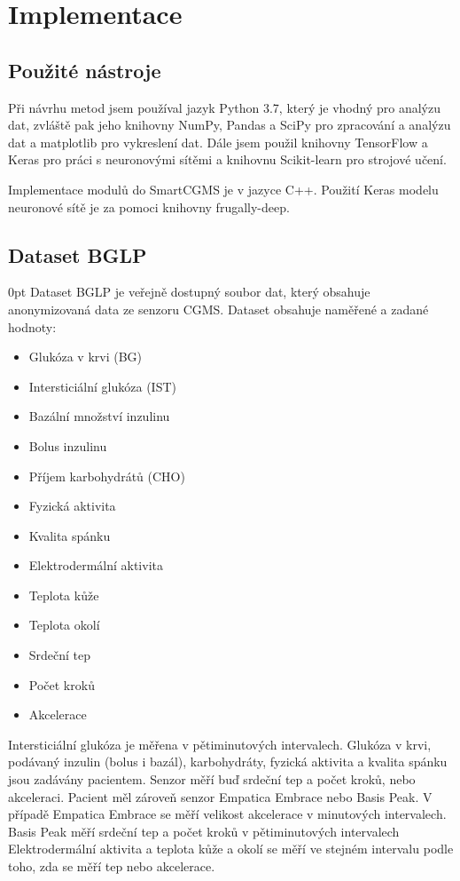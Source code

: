 \chapter{Implementace}

\section{Použité nástroje}

Při návrhu metod jsem používal jazyk Python 3.7, který je vhodný pro analýzu dat, zvláště pak jeho knihovny NumPy, Pandas a SciPy pro zpracování a analýzu dat a matplotlib pro vykreslení dat. Dále jsem použil knihovny TensorFlow a Keras pro práci s neuronovými sítěmi a knihovnu Scikit-learn pro strojové učení.

Implementace modulů do SmartCGMS je v jazyce C++. Použití Keras modelu neuronové sítě je za pomoci knihovny frugally-deep\citep{cho.frugally}.

\section{Dataset BGLP}
\label{ch:bglp}

\begin{setlength}{\parskip}{0pt}
Dataset BGLP je veřejně dostupný soubor dat, který obsahuje anonymizovaná data ze senzoru CGMS. Dataset obsahuje naměřené a zadané hodnoty:
\begin{itemize}
\setlength\itemsep{0em}
\item Glukóza v krvi (BG)
\item Intersticiální glukóza (IST)
\item Bazální množství inzulinu
\item Bolus inzulinu
\item Příjem karbohydrátů (CHO)
\item Fyzická aktivita
\item Kvalita spánku
\item Elektrodermální aktivita
\item Teplota kůže
\item Teplota okolí
\item Srdeční tep
\item Počet kroků
\item Akcelerace
\end{itemize}
\end{setlength}

Intersticiální glukóza je měřena v pětiminutových intervalech. Glukóza v krvi, podávaný inzulin (bolus i bazál), karbohydráty, fyzická aktivita a kvalita spánku jsou zadávány pacientem. Senzor měří buď srdeční tep a počet kroků, nebo akceleraci. Pacient měl zároveň senzor Empatica Embrace nebo Basis Peak. V případě Empatica Embrace se měří velikost akcelerace v minutových intervalech.
Basis Peak měří srdeční tep a počet kroků v pětiminutových intervalech Elektrodermální aktivita a teplota kůže a okolí se měří ve stejném intervalu podle toho, zda se měří tep nebo akcelerace.

